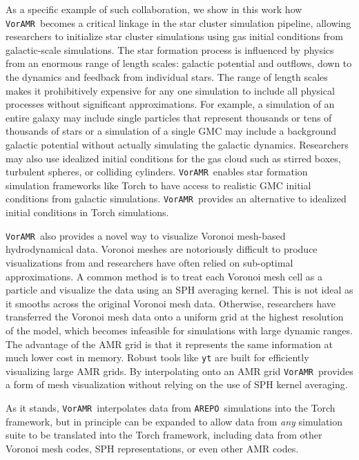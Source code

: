 \documentclass[twoside]{drexel-thesis}
\newcommand\voramr{\texttt{VorAMR}}
\newcommand\arepo{\texttt{AREPO}}
\begin{document}
\begin{thesis}
As a specific example of such collaboration, we show in this work how \voramr~becomes a critical linkage in the star cluster simulation pipeline, allowing researchers to initialize star cluster simulations using gas initial conditions from galactic-scale simulations. The star formation process is influenced by physics from an enormous range of length scales: galactic potential and outflows, down to the dynamics and feedback from individual stars. The range of length scales makes it prohibitively expensive for any one simulation to include all physical processes without significant approximations. For example, a simulation of an entire galaxy may include single particles that represent thousands or tens of thousands of stars or a simulation of a single GMC may include a background galactic potential without actually simulating the galactic dynamics. Researchers may also use idealized initial conditions for the gas cloud such as stirred boxes, turbulent spheres, or colliding cylinders. \voramr~enables star formation simulation frameworks like Torch to have access to realistic GMC initial conditions from galactic simulations. \voramr~provides an alternative to idealized initial conditions in Torch simulations.

\voramr~also provides a novel way to visualize Voronoi mesh-based hydrodynamical data. Voronoi meshes are notoriously difficult to produce visualizations from and researchers have often relied on sub-optimal approximations. A common method is to treat each Voronoi mesh cell as a particle and visualize the data using an SPH averaging kernel. This is not ideal as it smooths across the original Voronoi mesh data. Otherwise, researchers have transferred the Voronoi mesh data onto a uniform grid at the highest resolution of the model, which becomes infeasible for simulations with large dynamic ranges.  The advantage of the AMR grid is that it represents the same information at much lower cost in memory. Robust tools like \texttt{yt} \citep{turk_yt_2011} are built for efficiently visualizing large AMR grids. By interpolating onto an AMR grid \voramr~provides a form of mesh visualization without relying on the use of SPH kernel averaging. 

As it stands, \voramr~interpolates data from \arepo~simulations into the Torch framework, but in principle can be expanded to allow data from \emph{any} simulation suite to be translated into the Torch framework, including data from other Voronoi mesh codes, SPH representations, or even other AMR codes. 


\end{thesis}
\end{document}
